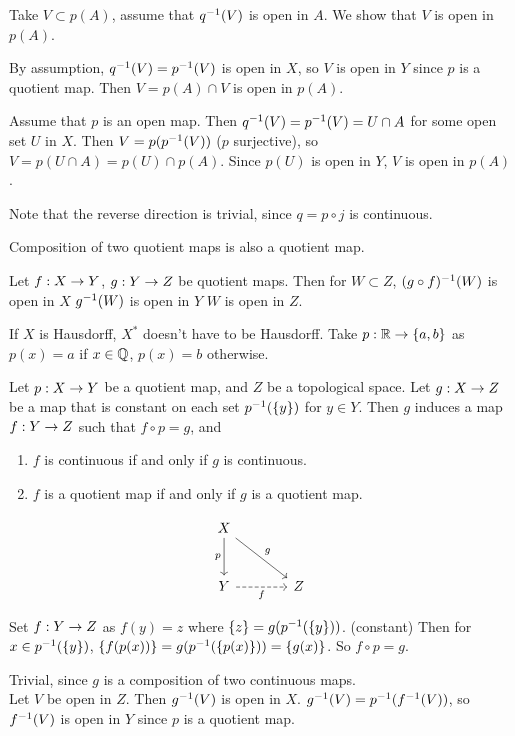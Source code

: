 Take \(V \subset p(A)\), assume that \(q^{-1}(V)\) is open in \(A\). We show that \(V\) is open in \(p(A)\).

 By assumption, \(q^{-1}(V) = p^{-1}(V)\) is open in \(X\), so \(V\) is open in \(Y\) since \(p\) is a quotient map. Then \(V = p(A) \cap V\) is open in \(p(A)\).

 Assume that \(p\) is an open map. Then \(q^{-1}(V) = p^{-1}(V) = U \cap A\) for some open set \(U\) in \(X\). Then \(V = p(p^{-1}(V))\) (\(p\) surjective), so \(V = p(U \cap A) = p(U) \cap p(A)\). Since \(p(U)\) is open in \(Y\), \(V\) is open in \(p(A)\).

Note that the reverse direction is trivial, since \(q = p \circ j\) is continuous.

\rmk Composition of two quotient maps is also a quotient map.

\pf Let \(f : X \rightarrow Y\), \(g : Y \rightarrow Z\) be quotient maps. Then for \(W \subset Z\), \((g\circ f)^{-1}(W)\) is open in \(X\) \miff \(g^{-1}(W)\) is open in \(Y\) \miff \(W\) is open in \(Z\).

\rmk If \(X\) is Hausdorff, \(X^*\) doesn't have to be Hausdorff. Take \(p: \mathbb{R} \rightarrow \{a, b\}\) as \(p(x) = a\) if \(x \in \mathbb{Q}\), \(p(x) = b\) otherwise.

 Let \(p : X \rightarrow Y\) be a quotient map, and \(Z\) be a topological space. Let \(g : X \rightarrow Z\) be a map that is constant on each set \(p^{-1}(\{y\})\) for \(y \in Y\). Then \(g\) induces a map \(f : Y \rightarrow Z\) such that \(f \circ p = g\), and
\begin{enumerate}
    \item \(f\) is continuous if and only if \(g\) is continuous.
    \item \(f\) is a quotient map if and only if \(g\) is a quotient map.
\end{enumerate}
\[
    \begin{tikzcd}[row sep = large, column sep = large]
        X \arrow[dr, "g"] \arrow[d, "p"'] & ~ \\
        Y \arrow[r, dashed, "f"'] & Z
    \end{tikzcd}
\]

\pf Set \(f: Y \rightarrow Z\) as \(f(y) = z\) where \(\{z\} = g(p^{-1}(\{y\}))\). (constant) Then for \(x \in p^{-1}(\{y\})\), \(\{f(p(x))\} = g(p^{-1}(\{p(x)\})) = \{g(x)\}\). So \(f\circ p = g\).

 \note{\mimp} Trivial, since \(g\) is a composition of two continuous maps. \\
\note{\mimpd} Let \(V\) be open in \(Z\). Then \(g^{-1}(V)\) is open in \(X\). \(g^{-1}(V) = p^{-1}(f^{-1}(V))\), so \(f^{-1}(V)\) is open in \(Y\) since \(p\) is a quotient map.

